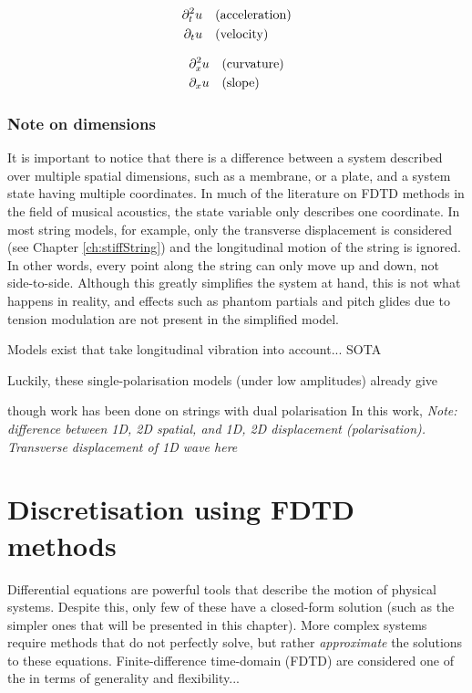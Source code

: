 \begin{minipage}[c]{0.49\textwidth}
    \begin{align*}
        \partial_t^2 u &\quad \text{(acceleration)}\\
        \partial_t u &\quad \text{(velocity)}
    \end{align*}
\end{minipage}
\begin{minipage}[c]{0.49\textwidth}
    \begin{align*}
    \partial_x^2 u &\quad \text{(curvature)}\\
    \partial_x u &\quad \text{(slope)}
    \end{align*}
\end{minipage}
\subsubsection{Note on dimensions}
It is important to notice that there is a difference between a system described over multiple spatial dimensions, such as a membrane, or a plate, and a system state having multiple coordinates. In much of the literature on FDTD methods in the field of musical acoustics, the state variable only describes one coordinate. In most string models, for example, only the transverse displacement is considered (see Chapter \ref{ch:stiffString}) and the longitudinal motion of the string is ignored. In other words, every point along the string can only move up and down, not side-to-side. Although this greatly simplifies the system at hand, this is not what happens in reality, and effects such as phantom partials and pitch glides due to tension modulation are not present in the simplified model. 

Models exist that take longitudinal vibration into account... SOTA

Luckily, these single-polarisation models (under low amplitudes) already give 

though work has been done on strings with dual polarisation \cite{Desvages2016}
In this work,  
\textit{Note: difference between 1D, 2D spatial, and 1D, 2D displacement (polarisation). Transverse displacement of 1D wave here}

\section{Discretisation using FDTD methods}
Differential equations are powerful tools that describe the motion of physical systems. Despite this, only few of these have a closed-form \SWcomment[or analytical] solution (such as the simpler ones that will be presented in this chapter). More complex systems require methods that do not perfectly solve, but rather \textit{approximate} the solutions to these equations. Finite-difference time-domain (FDTD) are considered one of the
in terms of generality and flexibility... 

